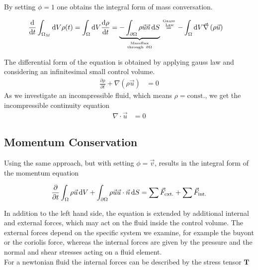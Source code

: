 By setting $\phi = 1$ one obtains the integral form of mass conversation.

\begin{align}
    \frac{\dif}{\dif t} \int_{\Omega_M}\dif V \rho(t) =  \int_{\Omega}\dif V \frac{\dif \rho}{\dif t}  &= \underbrace{-\int_{\partial \Omega}
     \rho \vec{u}\vec{n}\dif S}_{\mathrm{Massflux} \atop \mathrm{through \ } \partial \Omega} \stackrel{\text{Gauss} \atop \text{ Law}}{=}
      -\int_\Omega \dif V \vec{\nabla}\left(\rho \vec{u}\right)
\end{align}

The differential form of the equation is obtained by applying gauss law and considering an infinitesimal small control volume.
\begin{align}
     \frac{\partial \rho}{\partial t}  + \nabla \left(\rho \vec{u}\right) &= 0
\end{align}
As we investigate an incompressible fluid, which means $\rho = \text{const.}$, we get the incompressible continuity equation
\begin{align}
     \nabla \cdot \vec{u} &= 0
\end{align}

\subsection{Momentum Conservation}

Using the same approach, but with setting $\phi = \vec{v}$, results in the integral form of the momentum equation

\begin{align}
    \label{theorie:intimpulse}
    \pdn[]{t} \int_\Omega \rho \vec{u}\dif V + \int_{\partial\Omega} \rho\vec{u}\vec{u}\cdot \vec{n} \dif S =  \sum \vec{F}_{\text{ext.}} + \sum \vec{F}_{\text{int.}}
\end{align}

In addition to the left hand side, the equation is extended by additional internal and external forces, which may act on the fluid inside the control volume.
The external forces depend on the specific system  we examine, for example the buyont or the coriolis force, whereas the internal forces
are given by the pressure and the normal and shear stresses acting on a fluid element.\\
For a newtonian fluid the internal forces can be described by the stress tensor $\bm{T}$

